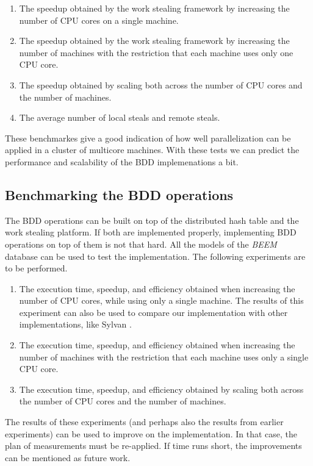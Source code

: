 \begin{enumerate}
	\item The speedup obtained by the work stealing framework by increasing the number of CPU cores on a single machine.
	\item The speedup obtained by the work stealing framework by increasing the number of machines with the restriction that each machine uses only one CPU core.
	\item The speedup obtained by scaling both across the number of CPU cores and the number of machines.
	\item The average number of local steals and remote steals.
\end{enumerate}

These benchmarkes give a good indication of how well parallelization can be applied in a cluster of multicore machines. With these tests we can predict the performance and scalability of the BDD implemenations a bit.

\subsection{Benchmarking the BDD operations}
The BDD operations can be built on top of the distributed hash table and the work stealing platform. If both are implemented properly, implementing BDD operations on top of them is not that hard. All the models of the \emph{BEEM} database \cite{pelanek2007beem} can be used to test the implementation. The following experiments are to be performed.

\begin{enumerate}
	\item The execution time, speedup, and efficiency obtained when increasing the number of CPU cores, while using only a single machine. The results of this experiment can also be used to compare our implementation with other implementations, like Sylvan \cite{sylvan_multicore_bdd}.
	\item The execution time, speedup, and efficiency obtained when increasing the number of machines with the restriction that each machine uses only a single CPU core.
	\item The execution time, speedup, and efficiency obtained by scaling both across the number of CPU cores and the number of machines.
\end{enumerate}

The results of these experiments (and perhaps also the results from earlier experiments) can be used to improve on the implementation. In that case, the plan of measurements must be re-applied. If time runs short, the improvements can be mentioned as future work.
